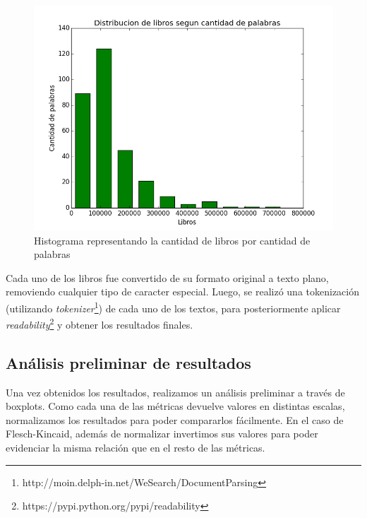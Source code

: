 \documentclass[12pt,journal,compsoc]{IEEEtran}
\begin{document}
\begin{figure}[H]
\begin{center}
  \includegraphics[width=6.0in]{../unigrams/scripts/histogram/histogramaDePalabras.png}
  \caption{Histograma representando la cantidad de libros por cantidad de palabras}
  \end{center}
\end{figure}

Cada uno de los libros fue convertido de su formato original a texto plano, removiendo cualquier tipo de caracter especial. Luego, se realizó una tokenización (utilizando \textit{tokenizer}\footnote{http://moin.delph-in.net/WeSearch/DocumentParsing}) de cada uno de los textos, para posteriormente aplicar \textit{readability}\footnote{https://pypi.python.org/pypi/readability} y obtener los resultados finales.

\subsection{Análisis preliminar de resultados}

Una vez obtenidos los resultados, realizamos un análisis preliminar a través de boxplots. Como cada una de las métricas devuelve valores en distintas escalas, normalizamos los resultados para poder compararlos fácilmente. En el caso de Flesch-Kincaid, además de normalizar invertimos sus valores para poder evidenciar la misma relación que en el resto de las métricas.
\end{document}
